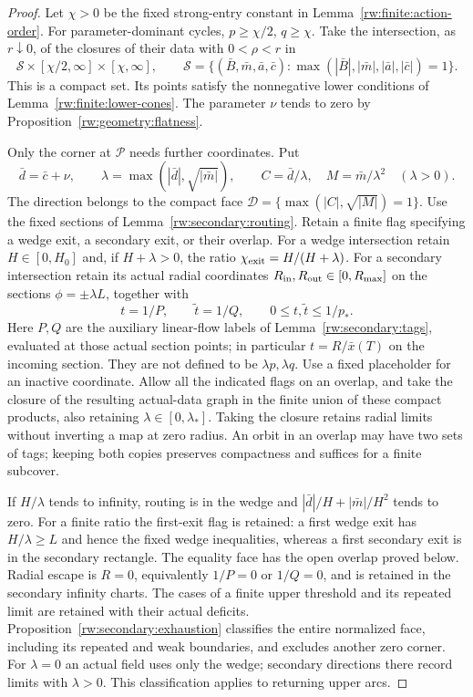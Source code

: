 \begin{proof}
Let $\chi>0$ be the fixed strong-entry constant in
Lemma~\ref{rw:finite:action-order}. For parameter-dominant
cycles, $p\ge\chi/2$, $q\ge\chi$. Take the intersection, as
$r\downarrow0$, of the closures of their data with $0<\rho<r$
in
\[
 \mathcal S\times[\chi/2,\infty]\times[\chi,\infty],
 \qquad
 \mathcal S=\{(\bar B,\bar m,\bar a,\bar c):
          \max(|\bar B|,|\bar m|,|\bar a|,|\bar c|)=1\}.
\]
This is a compact set. Its points satisfy the nonnegative lower
conditions of Lemma~\ref{rw:finite:lower-cones}. The parameter
$\nu$ tends to zero by Proposition~\ref{rw:geometry:flatness}.

Only the corner at $\mathcal P$ needs further coordinates. Put
\[
 \bar d=\bar c+\nu,\qquad
 \lambda=\max(|\bar d|,\sqrt{|\bar m|}),\qquad
 C=\bar d/\lambda,\quad M=\bar m/\lambda^2
 \quad(\lambda>0).
\]
The direction belongs to the compact face
$\mathcal D=\{\max(|C|,\sqrt{|M|})=1\}$. Use the fixed
sections of Lemma~\ref{rw:secondary:routing}. Retain a finite
flag specifying a wedge exit, a secondary exit, or their overlap.
For a wedge intersection retain $H\in[0,H_0]$ and, if
$H+\lambda>0$, the ratio
$\chi_{\rm exit}=H/(H+\lambda)$.
For a secondary intersection retain its actual radial coordinates
$R_{\rm in},R_{\rm out}\in[0,R_{\max}]$ on the sections
$\phi=\pm\lambda L$, together with
\[
 t=1/P,\qquad \widetilde t=1/Q,\qquad
 0\le t,\widetilde t\le1/p_* .
\]
Here $P,Q$ are the auxiliary linear-flow labels of
Lemma~\ref{rw:secondary:tags}, evaluated at those actual section
points; in particular $t=R/\bar x(T)$ on the incoming section.
They are not defined to be $\lambda p,\lambda q$.
Use a fixed placeholder for an inactive coordinate. Allow all the
indicated flags on an overlap, and take the closure of the resulting
actual-data graph in the finite union of these compact products,
also retaining $\lambda\in[0,\lambda_*]$.
Taking the closure retains radial limits without inverting a map
at zero radius. An orbit in an overlap may have two sets of tags;
keeping both copies preserves compactness and suffices for a finite
subcover.

If $H/\lambda$ tends
to infinity, routing is in the wedge and
$|\bar d|/H+|\bar m|/H^2$ tends to zero. For a finite ratio
the first-exit flag is retained: a first wedge exit has
$H/\lambda\ge L$ and hence the fixed wedge inequalities,
whereas a first secondary exit is in the secondary rectangle.
The equality face has the open overlap proved below. Radial escape is
$R=0$, equivalently $1/P=0$ or $1/Q=0$, and is retained in
the secondary infinity charts. The cases of a finite upper
threshold and its repeated limit are retained with their actual
deficits. Proposition~\ref{rw:secondary:exhaustion} classifies the
entire normalized face, including its repeated and weak boundaries,
and excludes another zero corner. For $\lambda=0$ an actual field
uses only the wedge; secondary directions there record limits with
$\lambda>0$. This classification applies to returning upper arcs.


\end{proof}
